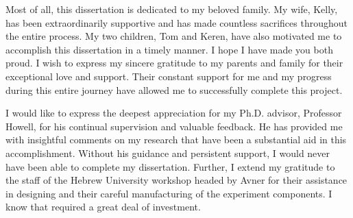 \documentclass[\main/master.tex]{subfiles}
\begin{document}
Most of all, this dissertation is dedicated to my beloved family. My wife, Kelly,
has been extraordinarily supportive and has made countless sacrifices throughout the entire
process. My two children, Tom and Keren, have also motivated me to accomplish this dissertation in a timely manner. I hope I have made you both proud. I wish to express my
sincere gratitude to my parents and family for their exceptional love and support. Their constant support for me and my progress during this entire journey have allowed me
to successfully complete this project. 
\par\noindent
I would like to express the deepest appreciation for my Ph.D. advisor, Professor Howell, for his continual supervision and valuable feedback. He
has provided me with insightful comments on my research that have been a substantial aid in this accomplishment. Without his guidance and persistent support, I would never have
been able to complete my dissertation. Further, I extend my gratitude to the staff of the Hebrew University workshop headed by Avner for their assistance in designing and their careful manufacturing of the experiment components. I know that required a great deal of investment.


\par\noindent
\end{document}
